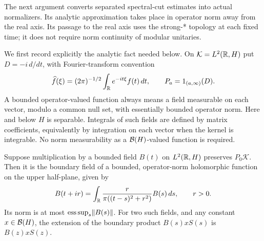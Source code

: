 The next argument converts separated spectral-cut estimates into actual
normalizers.  Its analytic approximation takes place in operator norm away
from the real axis.  Its passage to the real axis uses the strong-* topology
at each fixed time; it does not require norm continuity of modular unitaries.

We first record explicitly the analytic fact needed below.  On
$\mathcal K=L^2(\mathbb R,H)$ put $D=-i\,d/dt$, with Fourier-transform convention
\[
 \widehat f(\xi)=(2\pi)^{-1/2}\int_\mathbb R e^{-it\xi}f(t)\,dt,
 \qquad P_a=1_{(a,\infty)}(D).
\]
A bounded operator-valued function always means a field measurable on each
vector, modulo a common null set, with essentially bounded operator norm.
Here and below $H$ is separable.  Integrals of such fields are defined by
matrix coefficients, equivalently by integration on each vector when the
kernel is integrable.  No norm measurability as a $\mathcal B(H)$-valued function is
required.

\begin{lemma}
\label{lem:analytic-multiplier}
Suppose multiplication by a bounded field $B(t)$ on $L^2(\mathbb R,H)$ preserves
$P_0\mathcal K$.  Then it is the boundary field of a bounded, operator-norm
holomorphic function on the upper half-plane, given by
\begin{equation}\label{eq:analytic-poisson}
 B(t+ir)=\int_\mathbb R \frac{r}{\pi((t-s)^2+r^2)}B(s)\,ds,
 \qquad r>0.
\end{equation}
Its norm is at most $\mathop{\rm ess\,sup}_s\lVert B(s)\rVert$.
For two such fields, and any constant $x\in\mathcal B(H)$, the extension of the
boundary product $B(s)xS(s)$ is $B(z)xS(z)$.
\end{lemma}

